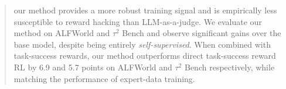 \documentclass{article}
\theoremstyle{plain}
\theoremstyle{definition}
\theoremstyle{remark}
\newcommand{\ie}{i.e.,}
\newcommand{\method}[0]{Reinforcement World Model Learning}
\newcommand{\shortmethod}[0]{RWML}
\newcommand{\wmrlshort}[0]{\shortmethod}
\begin{document}
\begin{abstract}
  our method provides a more robust training signal and is empirically less susceptible to reward hacking than LLM-as-a-judge.
We evaluate our method on ALFWorld and $\tau^2$ Bench and observe significant gains over the base model, despite being entirely \emph{self-supervised}.
When combined with task-success rewards, our method outperforms direct task-success reward RL by 6.9 and 5.7 points on ALFWorld and $\tau^2$ Bench respectively, while matching the performance of expert-data training.
\end{abstract}

\end{document}
